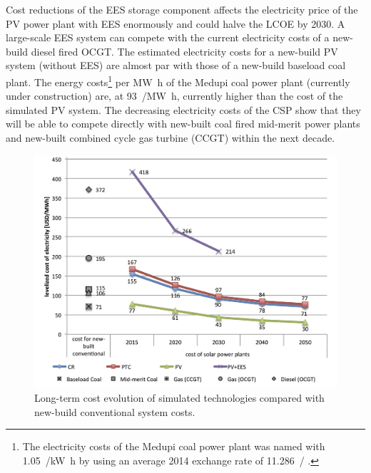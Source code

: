 Cost reductions of the \ac{EES} storage component affects the electricity price of the \ac{PV} power plant with \ac{EES} enormously and could halve the \ac{LCOE} by 2030. A large-scale \ac{EES} system can compete with the current electricity costs of a new-build diesel fired \ac{OCGT}. The estimated electricity costs for a new-build \ac{PV} system (without \ac{EES}) are almost par with those of a new-build baseload coal plant. The energy costs\footnote{The electricity costs of the Medupi coal power plant was named with \SI{1.05}{\zar/\kilo\watt\hour} \cite{Nedbank2013} by using an average 2014 exchange rate of \SI{11.286}{\usd/\zar} \cite{IRS2015}.} per \si{\mega\watt\hour} of the Medupi coal power plant (currently under construction) are, at \SI{93}{\usd/\mega\watt\hour}, currently higher than the cost of the simulated \ac{PV} system. The decreasing electricity costs of the \ac{CSP} show that they will be able to compete directly with new-built coal fired mid-merit power plants and new-built combined cycle gas turbine (CCGT) within the next decade.
\pagebreak
\begin{figure}[t]  
\centering
\includegraphics[width=1\linewidth]{FIG/Costdegrad}
\caption[Long-term cost evolution of simulated technologies compared with new-build conventional system costs.]{Long-term cost evolution of simulated technologies compared with new-build conventional system costs.}\label{Costdegrad}
\end{figure}


